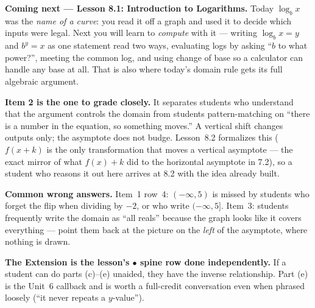 \documentclass[10pt]{article}
\begin{document}
\begin{spiralbox}
\textbf{Coming next --- Lesson 8.1: Introduction to Logarithms.} Today $\log_b x$ was the
\emph{name of a curve}: you read it off a graph and used it to decide which inputs were legal. Next
you will learn to \emph{compute} with it --- writing $\log_b x = y$ and $b^y = x$ as one statement
read two ways, evaluating logs by asking ``$b$ to what power?'', meeting the common log, and using
change of base so a calculator can handle any base at all. That is also where today's domain rule
gets its full algebraic argument.
\end{spiralbox}

\begin{teachernote}
\textbf{Item 2 is the one to grade closely.} It separates students who understand that the argument
controls the domain from students pattern-matching on ``there is a number in the equation, so
something moves.'' A vertical shift changes outputs only; the asymptote does not budge. Lesson~8.2
formalizes this ($f(x+k)$ is the only transformation that moves a vertical asymptote --- the exact
mirror of what $f(x)+k$ did to the horizontal asymptote in 7.2), so a student who reasons it out here
arrives at 8.2 with the idea already built.

\textbf{Common wrong answers.} Item~1 row~4: $(-\infty,5)$ is missed by students who forget the flip
when dividing by $-2$, or who write $(-\infty,5]$. Item~3: students frequently write the domain as
``all reals'' because the graph looks like it covers everything --- point them back at the picture on
the \emph{left} of the asymptote, where nothing is drawn.

\textbf{The Extension is the lesson's $\bullet$ spine row done independently.} If a student can do
parts (c)--(e) unaided, they have the inverse relationship. Part (e) is the Unit~6 callback and is
worth a full-credit conversation even when phrased loosely (``it never repeats a $y$-value'').
\end{teachernote}
\end{document}
